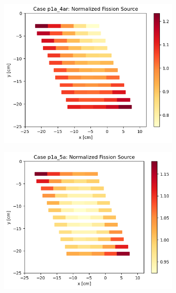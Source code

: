 \documentclass[letterpaper,11pt]{report}
\begin{document}
\begin{figure}[H]
      \begin{subfigure}{.32\textwidth}
        \centering
        \includegraphics[width=\linewidth]{../../phase1a/case4ar/analysis_output/p1a_4ar_c.png}
        \caption{}
      \end{subfigure}
      \begin{subfigure}{.33\textwidth}
        \centering
        \includegraphics[width=\linewidth]{../../phase1a/case5a/analysis_output/p1a_5a_c.png}
        \caption{}
      \end{subfigure}
      \begin{subfigure}{.33\textwidth}

\end{subfigure}
\end{figure}
\end{document}
